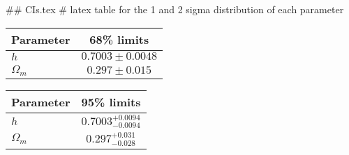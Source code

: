 ## CIs.tex
# latex table for the 1 and 2 sigma distribution of each parameter

\begin{tabular} { l  c}
 Parameter &  68\% limits\\
\hline
{\boldmath$h              $} & $0.7003\pm 0.0048          $\\
{\boldmath$\Omega_m       $} & $0.297\pm 0.015            $\\
\hline
\end{tabular}

\begin{tabular} { l  c}
 Parameter &  95\% limits\\
\hline
{\boldmath$h              $} & $0.7003^{+0.0094}_{-0.0094}$\\
{\boldmath$\Omega_m       $} & $0.297^{+0.031}_{-0.028}   $\\
\hline
\end{tabular}
